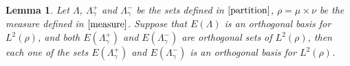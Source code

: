 \documentclass[reqno,a4paper,12pt]{amsart}
\numberwithin{equation}{section}
\newcounter{rem}
\newtheorem{lemma}[theorem]{Lemma}
\theoremstyle{remark}
\numberwithin{equation}{section}
\begin{document}
\begin{lemma}\label{3or}Let $\Lambda$, $\Lambda^{+}_\gamma$ and $\Lambda^{-}_\gamma$ be the sets defined in $\eqref{partition}$, $\rho=\mu\times\nu$ be the measure defined in $\eqref{measure}$.
Suppose that $E(\Lambda)$ is an orthogonal basis for $L^2(\rho)$, and both $E(\Lambda^{+}_\gamma)$ and $E(\Lambda^{-}_\gamma)$ are orthogonal sets of $L^2(\rho)$, then each one of the sets $E(\Lambda^{+}_\gamma)$ and $E(\Lambda^{-}_\gamma)$ is an orthogonal basis for $L^2(\rho)$.
\end{lemma}
%
\end{document}
